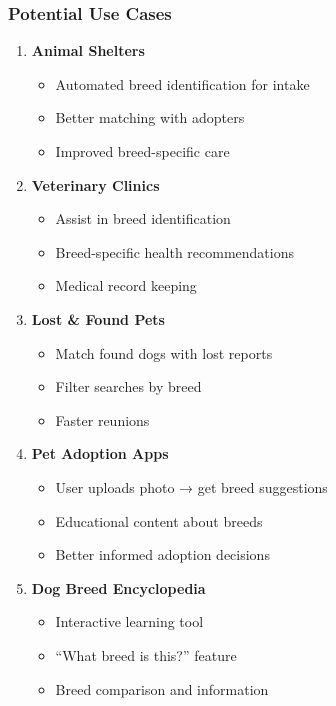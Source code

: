 \documentclass[
  letterpaper,
  DIV=11,
  numbers=noendperiod]{scrartcl}
\providecommand{\tightlist}{%
  \setlength{\itemsep}{0pt}\setlength{\parskip}{0pt}}
\begin{document}
\subsubsection{Potential Use Cases}\label{potential-use-cases}

\begin{enumerate}
\def\labelenumi{\arabic{enumi}.}
\tightlist
\item
  \textbf{Animal Shelters}

  \begin{itemize}
  \tightlist
  \item
    Automated breed identification for intake
  \item
    Better matching with adopters
  \item
    Improved breed-specific care
  \end{itemize}
\item
  \textbf{Veterinary Clinics}

  \begin{itemize}
  \tightlist
  \item
    Assist in breed identification
  \item
    Breed-specific health recommendations
  \item
    Medical record keeping
  \end{itemize}
\item
  \textbf{Lost \& Found Pets}

  \begin{itemize}
  \tightlist
  \item
    Match found dogs with lost reports
  \item
    Filter searches by breed
  \item
    Faster reunions
  \end{itemize}
\item
  \textbf{Pet Adoption Apps}

  \begin{itemize}
  \tightlist
  \item
    User uploads photo → get breed suggestions
  \item
    Educational content about breeds
  \item
    Better informed adoption decisions
  \end{itemize}
\item
  \textbf{Dog Breed Encyclopedia}

  \begin{itemize}
  \tightlist
  \item
    Interactive learning tool
  \item
    ``What breed is this?'' feature
  \item
    Breed comparison and information
  \end{itemize}
\end{enumerate}
\end{document}
